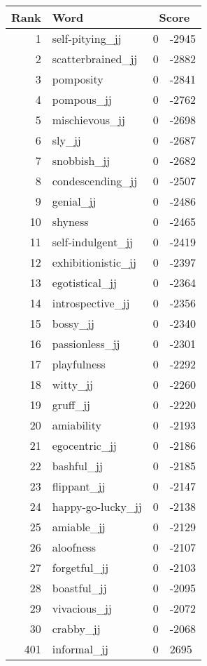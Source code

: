 \begin{longtable}[!htbp]{| rlr@{.}l |}
    \hline
    \textbf{Rank} & \textbf{Word} & \multicolumn{2}{c|}{\textbf{Score}} \\
    \hline
    \endhead
    1 & self-pitying\_jj & 0 & -2945 \\
    2 & scatterbrained\_jj & 0 & -2882 \\
    3 & pomposity & 0 & -2841 \\
    4 & pompous\_jj & 0 & -2762 \\
    5 & mischievous\_jj & 0 & -2698 \\
    6 & sly\_jj & 0 & -2687 \\
    7 & snobbish\_jj & 0 & -2682 \\
    8 & condescending\_jj & 0 & -2507 \\
    9 & genial\_jj & 0 & -2486 \\
    10 & shyness & 0 & -2465 \\
    11 & self-indulgent\_jj & 0 & -2419 \\
    12 & exhibitionistic\_jj & 0 & -2397 \\
    13 & egotistical\_jj & 0 & -2364 \\
    14 & introspective\_jj & 0 & -2356 \\
    15 & bossy\_jj & 0 & -2340 \\
    16 & passionless\_jj & 0 & -2301 \\
    17 & playfulness & 0 & -2292 \\
    18 & witty\_jj & 0 & -2260 \\
    19 & gruff\_jj & 0 & -2220 \\
    20 & amiability & 0 & -2193 \\
    21 & egocentric\_jj & 0 & -2186 \\
    22 & bashful\_jj & 0 & -2185 \\
    23 & flippant\_jj & 0 & -2147 \\
    24 & happy-go-lucky\_jj & 0 & -2138 \\
    25 & amiable\_jj & 0 & -2129 \\
    26 & aloofness & 0 & -2107 \\
    27 & forgetful\_jj & 0 & -2103 \\
    28 & boastful\_jj & 0 & -2095 \\
    29 & vivacious\_jj & 0 & -2072 \\
    30 & crabby\_jj & 0 & -2068 \\
    401 & informal\_jj & 0 & 2695 \\

\end{longtable}
